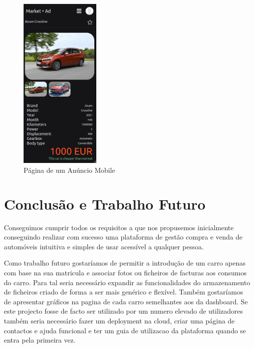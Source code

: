 \documentclass[a4paper]{report}
\begin{document}
\begin{figure}[H]
    \centering
    \includegraphics[width=0.35\textwidth]{images/ad_mobile.png}
    \caption{Página de um Anúncio Mobile}
\end{figure}

\chapter{Conclusão e Trabalho Futuro}

Conseguimos cumprir todos os requisitos a que nos propusemos inicialmente
conseguindo realizar com sucesso uma plataforma de gestão compra e venda
de automóveis intuitiva e simples de usar acessível a qualquer pessoa.

Como trabalho futuro gostaríamos de permitir a introdução de um carro
apenas com base na sua matricula e associar fotos ou ficheiros de facturas
aos consumos do carro. Para tal seria necessário expandir as funcionalidades
do armazenamento de ficheiros criado de forma a ser mais genérico e flexível.
Também gostaríamos de apresentar gráficos na pagina de cada carro
semelhantes aos da dashboard. Se este projecto fosse de facto ser utilizado por um
numero elevado de utilizadores também seria necessário fazer um deployment na
cloud, criar uma página de contactos e ajuda funcional e ter um guia de utilizacao
da plataforma quando se entra pela primeira vez.
\end{document}
